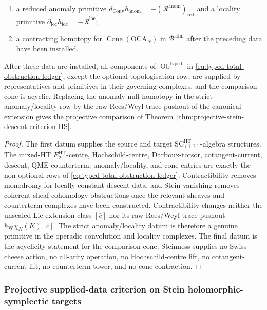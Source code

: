 \begin{thm}
\begin{enumerate}[label=\textup{(\roman*)}]
        primitives, and Roos compatibility primitives as in
        Definition~\ref{defn:typed-brane-defect-qme-tower};
  \item a reduced anomaly primitive
        \(d_{\mathrm{Conv}}h_{\mathrm{anom}}
        =-(\mathcal R^{\mathrm{anom}})_{\mathrm{red}}\) and a locality
        primitive \(\partial_{\mathrm{loc}}h_{\mathrm{loc}}
        =-\mathcal R^{\mathrm{loc}}\);
  \item a contracting homotopy for
        \(\operatorname{Cone}(\mathrm{OCA}_N)\) in
        \(\mathcal B^{\mathrm{adm}}\) after the preceding data have
        been installed.
\end{enumerate}
After these data are installed, all components of
\(\operatorname{Ob}^{\mathrm{typed}}\) in
\eqref{eq:typed-total-obstruction-ledger}, except the optional
topologisation row, are supplied by representatives and primitives in
their governing complexes, and the comparison cone is acyclic.  Replacing
the anomaly null-homotopy in the strict anomaly/locality row by the raw
Rees/Weyl trace pushout of the canonical extension gives the projective comparison of
Theorem~\ref{thm:projective-stein-descent-criterion-HS}.
\end{thm}

\begin{proof}
The first datum supplies the source and target
\(\mathrm{SC}^{\mathrm{HT}}_{(1,2)}\)-algebra structures.  The
mixed-HT \(E_2^{\mathrm{HT}}\)-centre, Hochschild-centre,
Darboux-torsor, cotangent-current, descent, QME-counterterm,
anomaly/locality, and cone entries are exactly the non-optional rows
of \eqref{eq:typed-total-obstruction-ledger}.  Contractibility removes
monodromy for locally constant descent data, and Stein
vanishing removes coherent sheaf cohomology obstructions once the
relevant sheaves and counterterm complexes have been constructed.
Contractibility changes neither the unscaled Lie extension class
\([\bar c]\) nor its raw Rees/Weyl trace pushout
\(\hbar_{\mathrm W}\chi_N(K)[\bar c]\).  The strict anomaly/locality datum is therefore a
genuine primitive in the operadic convolution and locality complexes.
The final datum is the acyclicity statement for the comparison cone.
Steinness supplies no Swiss-cheese action, no all-arity operation, no
Hochschild-centre lift, no cotangent-current lift, no counterterm tower,
and no cone contraction.
\end{proof}

\subsubsection{Projective supplied-data criterion on Stein
holomorphic-symplectic targets}
\label{sssec:projective-stein-descent-criterion}

